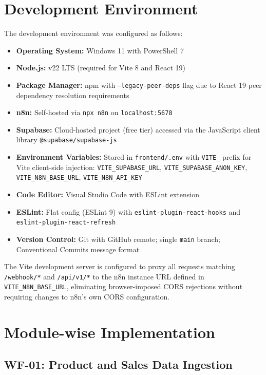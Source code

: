 \section{Development Environment}

The development environment was configured as follows:

\begin{itemize}[itemsep=3pt]
  \item \textbf{Operating System:} Windows 11 with PowerShell 7
  \item \textbf{Node.js:} v22 LTS (required for Vite 8 and React 19)
  \item \textbf{Package Manager:} npm with \texttt{--legacy-peer-deps} flag due to
        React 19 peer dependency resolution requirements
  \item \textbf{n8n:} Self-hosted via \texttt{npx n8n} on \texttt{localhost:5678}
  \item \textbf{Supabase:} Cloud-hosted project (free tier) accessed via the JavaScript
        client library \texttt{@supabase/supabase-js}
  \item \textbf{Environment Variables:} Stored in \texttt{frontend/.env} with
        \texttt{VITE\_} prefix for Vite client-side injection:
        \texttt{VITE\_SUPABASE\_URL}, \texttt{VITE\_SUPABASE\_ANON\_KEY},
        \texttt{VITE\_N8N\_BASE\_URL}, \texttt{VITE\_N8N\_API\_KEY}
  \item \textbf{Code Editor:} Visual Studio Code with ESLint extension
  \item \textbf{ESLint:} Flat config (ESLint 9) with
        \texttt{eslint-plugin-react-hooks} and \texttt{eslint-plugin-react-refresh}
  \item \textbf{Version Control:} Git with GitHub remote; single \texttt{main} branch;
        Conventional Commits message format
\end{itemize}

The Vite development server is configured to proxy all requests matching \texttt{/webhook/*}
and \texttt{/api/v1/*} to the n8n instance URL defined in \texttt{VITE\_N8N\_BASE\_URL},
eliminating browser-imposed CORS rejections without requiring changes to n8n's own CORS
configuration.

\section{Module-wise Implementation}

\subsection{WF-01: Product and Sales Data Ingestion}

